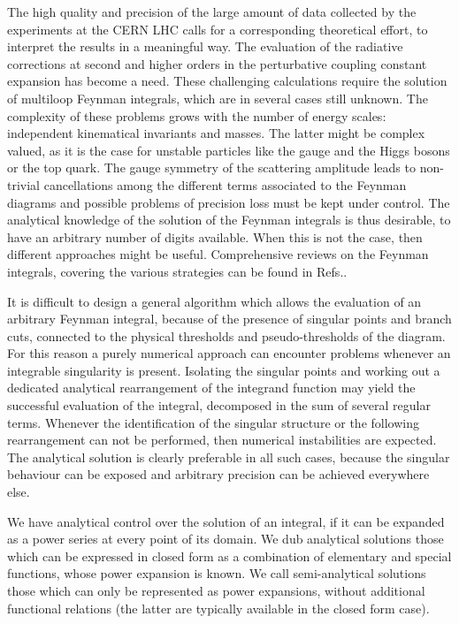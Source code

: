 \documentclass[final,1p,times]{elsarticle}
\begin{document}
The high quality and precision of the large amount of data collected by the experiments at the CERN LHC calls for a corresponding theoretical effort, to interpret the results in a meaningful way.
The evaluation of the radiative corrections at second and higher orders in the perturbative coupling constant expansion has become a need.
These challenging calculations require the solution of multiloop Feynman integrals, which are in several cases still unknown.
The complexity of these problems grows with the number of energy scales: independent kinematical invariants and masses. The latter might be complex valued, as it is the case for unstable particles like the gauge and the Higgs bosons or the top quark.
The gauge symmetry of the scattering amplitude leads to non-trivial cancellations among the different terms associated to the Feynman diagrams and possible problems of precision loss must be kept under control. The analytical knowledge of the solution of the Feynman integrals is thus desirable, to have an arbitrary number of digits available. When this is not the case, then different approaches might be useful.
Comprehensive reviews on the Feynman integrals, covering the various strategies can be found in Refs.\cite{Heinrich:2020ybq,Weinzierl:2022eaz,Bourjaily:2022bwx,Blumlein:2022zkr}.



It is difficult to design  a general algorithm which allows the evaluation of an arbitrary Feynman integral, because of the presence of singular points and branch cuts, connected to the physical thresholds and pseudo-thresholds of the diagram. For this reason a purely numerical approach \cite{Smirnov:2015mct,Borowka:2017idc} can encounter problems whenever an integrable singularity is present. Isolating the singular points and working out a dedicated analytical rearrangement of the integrand function may yield the successful evaluation of the integral, decomposed in the sum of several regular terms.
Whenever the identification of the singular structure or the following rearrangement can not be performed, then numerical instabilities are expected. The analytical solution is clearly preferable in all such cases, because the singular behaviour can be exposed and arbitrary precision can be achieved everywhere else.

We have analytical control over the solution of an integral, if it can be expanded as a power series at every point of its domain.
We dub analytical solutions those which can be expressed in closed form as a combination of elementary and special functions, whose power expansion is known. We call semi-analytical solutions those which can only be represented as power expansions, without additional functional relations (the latter are typically available in the closed form case).
\end{document}
